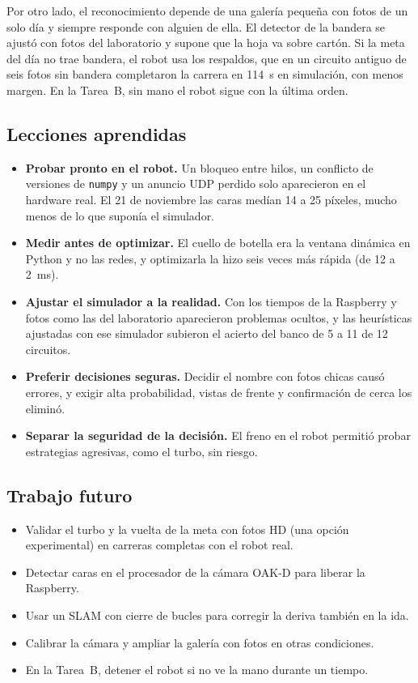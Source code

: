 \documentclass[11pt,a4paper]{article}
\begin{document}
Por otro lado, el reconocimiento depende de una galería pequeña con fotos de un solo día y siempre responde con alguien de ella. El detector de la bandera se ajustó con fotos del laboratorio y supone que la hoja va sobre cartón. Si la meta del día no trae bandera, el robot usa los respaldos, que en un circuito antiguo de seis fotos sin bandera completaron la carrera en \SI{114}{\second} en simulación, con menos margen. En la Tarea~B, sin mano el robot sigue con la última orden.

\subsection{Lecciones aprendidas}

\begin{itemize}
  \item \textbf{Probar pronto en el robot.} Un bloqueo entre hilos, un conflicto de versiones de \texttt{numpy} y un anuncio UDP perdido solo aparecieron en el hardware real. El 21 de noviembre las caras medían 14 a 25 píxeles, mucho menos de lo que suponía el simulador.
  \item \textbf{Medir antes de optimizar.} El cuello de botella era la ventana dinámica en Python y no las redes, y optimizarla la hizo seis veces más rápida (de 12 a \SI{2}{\milli\second}).
  \item \textbf{Ajustar el simulador a la realidad.} Con los tiempos de la Raspberry y fotos como las del laboratorio aparecieron problemas ocultos, y las heurísticas ajustadas con ese simulador subieron el acierto del banco de 5 a 11 de 12 circuitos.
  \item \textbf{Preferir decisiones seguras.} Decidir el nombre con fotos chicas causó errores, y exigir alta probabilidad, vistas de frente y confirmación de cerca los eliminó.
  \item \textbf{Separar la seguridad de la decisión.} El freno en el robot permitió probar estrategias agresivas, como el turbo, sin riesgo.
\end{itemize}

\subsection{Trabajo futuro}

\begin{itemize}
  \item Validar el turbo y la vuelta de la meta con fotos HD (una opción experimental) en carreras completas con el robot real.
  \item Detectar caras en el procesador de la cámara OAK-D para liberar la Raspberry.
  \item Usar un SLAM con cierre de bucles para corregir la deriva también en la ida.
  \item Calibrar la cámara y ampliar la galería con fotos en otras condiciones.
  \item En la Tarea~B, detener el robot si no ve la mano durante un tiempo.
\end{itemize}
\end{document}
